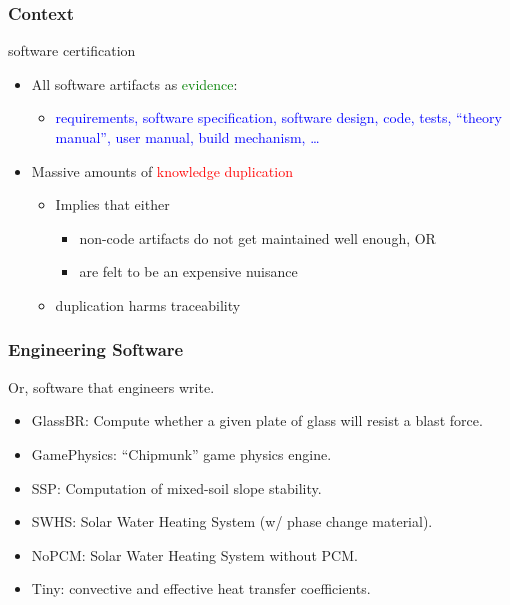 \documentclass{beamer}
\begin{document}

\begin{frame}
\frametitle{Context}
{\Large software certification}
\vspace*{.2cm}
\begin{itemize}
\item<3->All software artifacts as \textcolor{green}{evidence}:
\begin{itemize}
\item \textcolor{blue}{requirements, software specification, software design, code, 
  tests, ``theory manual'', user manual, build mechanism, \ldots}
\end{itemize}
\vspace*{.5cm}
\item<4->Massive amounts of \textcolor{red}{knowledge duplication}
\begin{itemize}
  \item Implies that either
  \begin{itemize}
    \item non-code artifacts do not get maintained well enough, OR
    \item are felt to be an expensive nuisance
  \end{itemize}
  \item duplication harms traceability
\end{itemize}
\end{itemize}
\vfill
\end{frame}

\begin{frame}
\frametitle{Engineering Software}
Or, software that engineers write.
\begin{itemize}
\item {\color{blue}GlassBR}: Compute whether a given plate of glass will resist a blast force.
\item GamePhysics: ``Chipmunk'' game physics engine.
\item SSP: Computation of mixed-soil slope stability.
\item SWHS: Solar Water Heating System (w/ phase change material).
\item NoPCM: Solar Water Heating System without PCM.
\item Tiny: convective and effective heat transfer coefficients.
\end{itemize}
\end{frame}
\end{document}
